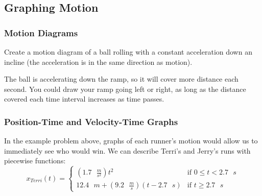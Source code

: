 \subsection{Graphing Motion}

\subsubsection{Motion Diagrams}

\begin{Worked}
\begin{Problem}
Create a motion diagram of a ball rolling with a constant 
acceleration down an incline (the acceleration is in the same direction as 
motion). 
\end{Problem}
\begin{Solution}
The ball is accelerating down the ramp, so it will cover 
more distance each second. You could draw your ramp going left or right, as 
long as the distance covered each time interval increases as time passes. 

\begin{center}
\end{center}
\end{Solution}
\end{Worked}

\subsubsection{Position-Time and Velocity-Time Graphs}


In the example problem above, graphs of each runner's motion would allow us to 
immediately see who would win. We can describe Terri's and Jerry's runs with 
piecewise functions:
$$x_{Terri}(t) = \begin{cases}
\left( 1.7 \text{ } \frac{m}{s^2} \right)t^2 & \text{if } 0 \leq t < 2.7 
\text{ }s\\
12.4 \text{ } m + \left( 9.2 \text{ } \frac{m}{s} \right) \left( t - 2.7 \text{ } 
s \right) & \text{if } t \geq 2.7 \text{ }s
\end{cases}$$

